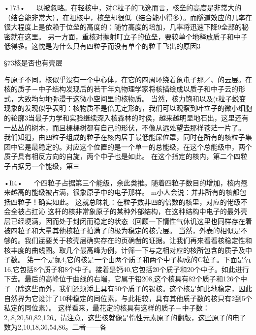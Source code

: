 •173•
  
以被忽略。在轻核中，对C粒子的飞逸而言，核垒的高度是非常大的（结合能非常大），在祖核中，核垒却很低（结合能小得多）。而隧道效应的几率在很大程度上是依赖于位垒的高度的：随竹高度的培加，几率将迅速下降9全部的秘密就在这里。
另一方面，重核对抛射叮立子的位垒，要较单个地释放质子和中子低得多。这忱是为什么只有四粒子而没有单个的粒千飞出的原因3

§73核是否也有壳层

与原子不同，核似乎没有一个中心体，在它的四周环绕着象屯子那／、的云层。在核的质子－中子结构发现后的若干年丸物理学家将核描绘成以质子和中子云的形式，大致均匀地弥漫于这微小空间里的核物质。
当然，核力饱和以及(t粒子蜕变现象的发现似乎表明：核物质不是倍无定形的，我们可以观察到叶立子的微小细胞的轮廓3当最子力学和实验继续深入核森林的时侯，越来越明显地石出，这里还有一丛丛的树木，而且棵棵树都有自己的形伏，不像从远处望去那样苍茫一片了。
我们知逍，由四粒子组成的粒子在核内居于最低能屎位罩，同时在所有的核粒子集团中它是最稳定的。对应这个位置的是一个单一的总能级，在这个总能级中，两个质子具有相反方向的自旋，两个中子也是如此。
在这个指定的核内，第二个四粒子占据另一个能级，第三

•Ii4•
  
个四粒子占据第三个能级，余此类推。随着四粒子数目的增加，核内翘来越高的能级被占满，很象原子中的电子那样。
m小人会说：并非所有的核都包括四粒子！确实如此。
这就总昧礼：在粒子数非四的倍数的核里，对应的佬级不会全被占扛沁
这杆的核非常象原子的某种外部结构，在这种结构中电子的最外壳层已经埂满，因而处于封闭而稳定的状态（回顾一下惰性气休讥这里也同样存在着被四粒子和大量其他核粒子拍满了的极为稳定的核壳层。
当然，外表的相似是不够的。我们盓要关于核壳层确实存在的页确凿的证据。让我们再来看看核稳定性和核丰度的曲线图。取几个最高峰为例，计筛一下与之相对应的核所包含的质子及中子数。
笫一个是氮4,它的核是一个由两个质子和两个中子构成的C粒子。下面是氧16,它包括8个质子和8个中子。接着是钙40,它包括20个质子和20个中子。如此进行下去。最后的高峰位于曲线的右端，它属于铅208,这个核具有82个质子和126个中子（除这些而外，我们还须添上具有50个质子的锡核。这个核是如此地稳定，因此自然界为它设计了10种稳定的同位素，与此相较，具有其他质子数的核只有2到5个私定的同位素）。
这样看来，最花定的核具有这样的质子－中子数：2,.8,20,50,82,126。请注意，这些核就像是惰性元素原子的翻版，这些原子的电子数为2,10,18,36,54,86。二者——各

